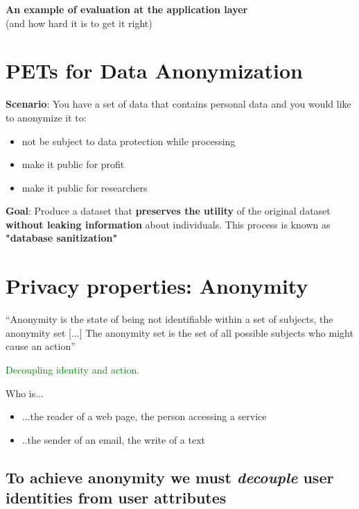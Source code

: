 \documentclass[11pt]{article}
\begin{document}
\vspace{0.5cm}

\begin{center}
  {\LARGE \textbf{An example of evaluation at the application layer}} \\
  (and how hard it is to get it right)
\end{center}
\vspace{0.5cm}

\section*{PETs for Data Anonymization}

\textbf{Scenario}: You have a set of data that contains personal data and you would like to anonymize it to:
\begin{itemize}
	\item not be subject to data protection while processing
	\item make it public for profit
	\item make it public for researchers
\end{itemize}

\textbf{Goal}: Produce a dataset that \textbf{preserves the utility} of the original dataset \textbf{without leaking information} about individuals. This process is known as \textbf{"database sanitization"}

\section*{Privacy properties: \textbf{Anonymity}}

“Anonymity is the state of being not identifiable within a set of subjects, the anonymity set [...] The anonymity set is the set of all possible subjects who might cause an action” 

\textcolor{green}{Decoupling identity and action.}

Who is...
\begin{itemize}
	\item ...the reader of a web page, the person accessing a service
	\item ..the sender of an email, the write of a text 
\end{itemize}

\subsection*{To achieve anonymity we must \textit{decouple} user identities from user attributes}
\end{document}
